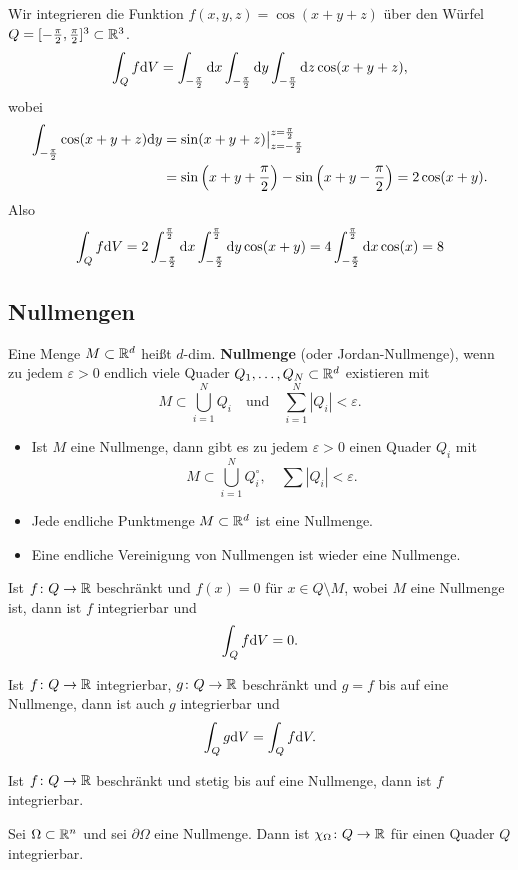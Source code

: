 \begin{beispiel}
	Wir integrieren die Funktion $f(x,y,z) = \cos(x+y+z)$ über den Würfel $Q = [-\frac{\pi}{2}, \frac{\pi}{2}]^3 \subset \mathbb{R}^3$.
	\[\int_Q f \mathrm{d} V = \int_{-\frac{\pi}{2}} \mathrm{d} x \int_{-\frac{\pi}{2}} \mathrm{d} y \int_{-\frac{\pi}{2}} \mathrm{d} z \cos(x+y+z),\]
	wobei
	\begin{align*}
		\int_{-\frac{\pi}{2}} \cos(x+y+z)\mathrm{d} y &= \sin(x+y+z)\big|_{z = -\frac{\pi}{2}}^{z = \frac{\pi}{2}}\\ 
		&= \sin\left(x+y+\frac{\pi}{2}\right) - \sin\left(x+y-\frac{\pi}{2}\right) = 2 \cos(x+y).
	\end{align*}
	Also
	\begin{align*}
		\int_Q f \mathrm{d} V = 2 \int_{-\frac{\pi}{2}}^{\frac{\pi}{2}} \mathrm{d} x \int_{-\frac{\pi}{2}}^{\frac{\pi}{2}} \mathrm{d} y \cos(x+y) = 4 \int_{-\frac{\pi}{2}}^{\frac{\pi}{2}} \mathrm{d} x \cos(x) = 8
	\end{align*}
\end{beispiel}

\subsection{Nullmengen}
Eine Menge $M \subset \mathbb{R}^d$ heißt $d$-dim. \textbf{Nullmenge} (oder Jordan-Nullmenge), wenn zu jedem $\varepsilon > 0$ endlich viele Quader $Q_1, \dots, Q_N \subset \mathbb{R}^d$ existieren mit
\[M \subset \bigcup_{i=1}^N Q_i\quad\text{und}\quad \sum_{i=1}^N |Q_i| < \varepsilon.\]
\begin{rem}
	\begin{itemize}
		\item Ist $M$ eine Nullmenge, dann gibt es zu jedem $\varepsilon>0$ einen Quader $Q_i$ mit
		\[M \subset \bigcup_{i=1}^N Q_i^\circ , \quad \sum |Q_i| < \varepsilon.\]
		\item Jede endliche Punktmenge $M \subset \mathbb{R}^d$ ist eine Nullmenge.
		\item Eine endliche Vereinigung von Nullmengen ist wieder eine Nullmenge.
	\end{itemize}
\end{rem}
\begin{satz}\label{satz2_10}
	Ist $f \colon Q \to \mathbb{R}$ beschränkt und $f(x) = 0$ für $x \in Q \setminus M$, wobei $M$ eine Nullmenge ist, dann ist $f$ integrierbar und 
	\[\int_Q f \mathrm{d} V = 0.\]
\end{satz}
\begin{kor}\label{kor2_11}
	Ist $f \colon Q \to \mathbb{R}$ integrierbar, $g \colon Q \to \mathbb{R}$ beschränkt und $g=f$ bis auf eine Nullmenge, dann ist auch $g$ integrierbar und
	\[\int_Q g \mathrm{d} V = \int_Q f \mathrm{d} V.\]
\end{kor}
\begin{thm}\label{thm2_12}
	Ist $f \colon Q \to \mathbb{R}$ beschränkt und stetig bis auf eine Nullmenge, dann ist $f$ integrierbar.
\end{thm}
\begin{kor}\label{kor2_13}
	Sei $\Omega \subset \mathbb{R}^n$ und sei $\partial\Omega$ eine Nullmenge. Dann ist $\chi_\Omega \colon Q \to \mathbb{R}$ für einen Quader $Q$ integrierbar.
\end{kor}
